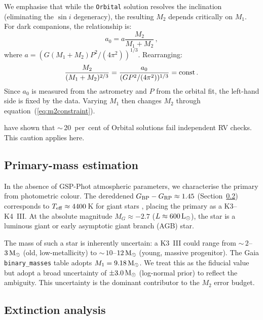 \documentclass[usenatbib,fleqn]{mnras}
\newcommand{\Msun}{{\rm M}_\odot}
\newcommand{\Lsun}{{\rm L}_\odot}
\begin{document}
We emphasise that while the \texttt{Orbital} solution resolves the
inclination (eliminating the $\sin i$ degeneracy), the resulting
$M_2$ depends critically on $M_1$.  For dark companions, the
relationship is:
\begin{equation}
a_0 = a \frac{M_2}{M_1 + M_2} \,,
\label{eq:a0}
\end{equation}
where $a = (G(M_1 + M_2) P^2 / (4\pi^2))^{1/3}$.  Rearranging:
\begin{equation}
\frac{M_2}{(M_1 + M_2)^{2/3}} =
  \frac{a_0}{(G P^2 / (4\pi^2))^{1/3}} = {\rm const} \,.
\label{eq:m2constraint}
\end{equation}
Since $a_0$ is measured from the astrometry and $P$ from the
orbital fit, the left-hand side is fixed by the data.  Varying
$M_1$ then changes $M_2$ through equation~(\ref{eq:m2constraint}).

\citet{ElBadry2024} have shown that $\sim$\,20~per~cent of Orbital
solutions fail independent RV checks.  This caution applies here.

\subsection{Primary-mass estimation}
\label{sec:methods:m1}

In the absence of GSP-Phot atmospheric parameters, we characterise
the primary from photometric colour.  The dereddened
$G_{\rm BP} - G_{\rm RP} \approx 1.45$ (Section~\ref{sec:methods:extinction})
corresponds to $T_{\rm eff} \approx 4400$\,K for giant stars
\citep{PecautMamajek2013, Andrae2023}, placing the primary as a
K3--K4~III.  At the absolute magnitude $M_G \approx -2.7$
($L \approx 600\,\Lsun$), the star is a luminous giant or early
asymptotic giant branch (AGB) star.

The mass of such a star is inherently uncertain: a K3~III could
range from $\sim$\,$2$--$3\,\Msun$ (old, low-metallicity) to
$\sim$\,$10$--$12\,\Msun$ (young, massive progenitor).  The Gaia
\texttt{binary\_masses} table adopts $M_1 = 9.18\,\Msun$.  We
treat this as the fiducial value but adopt a broad uncertainty of
$\pm 3.0\,\Msun$ (log-normal prior) to reflect the ambiguity.
This uncertainty is the dominant contributor to the $M_2$ error
budget.

\subsection{Extinction analysis}
\label{sec:methods:extinction}
\end{document}
